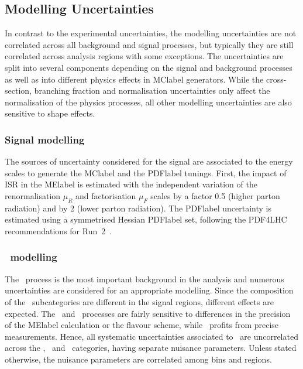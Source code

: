 \subsection{Modelling Uncertainties}
In contrast to the experimental uncertainties, the modelling uncertainties are not correlated across all background and signal processes, but typically they are still correlated across analysis regions with some exceptions. The uncertainties are split into several components depending on the signal and background processes as well as into different physics effects in \acrshort{MClabel} generators. While the cross-section, branching fraction and normalisation uncertainties only affect the normalisation of the physics processes, all other modelling uncertainties are also sensitive to shape effects.


\subsubsection{Signal modelling}

The sources of uncertainty considered for the signal are associated to the energy scales to generate the \acrshort{MClabel} and the \acrshort{PDFlabel} tunings. First, the impact of ISR in the \acrshort{MElabel} is estimated with the independent variation of the renormalisation $\mu_R$ and factorisation $\mu_F$ scales by a factor 0.5 (higher parton radiation) and by 2 (lower parton radiation). The \acrshort{PDFlabel} uncertainty is estimated using a symmetrised Hessian \acrshort{PDFlabel} set, following the PDF4LHC recommendations for Run~2~\cite{Butterworth_2016}.

\subsubsection{\ttbar\ modelling}
\label{Hplustb:Sectionttbarmodelling}
The \ttbar\ process is the most important background in the analysis and numerous uncertainties are considered for an appropriate modelling. Since the composition of the \ttbar\ subcategories are different in the signal regions, different effects are expected. The \ttb\ and \ttc\ processes are fairly sensitive to differences in the precision of the \acrshort{MElabel} calculation or the flavour scheme, while \ttl\ profits from precise measurements. Hence, all systematic uncertainties associated to \ttbar\ are uncorrelated across the \ttb, \ttc\ and \ttl\ categories, having separate nuisance parameters. Unless stated otherwise, the nuisance parameters are correlated among bins and regions.\\

